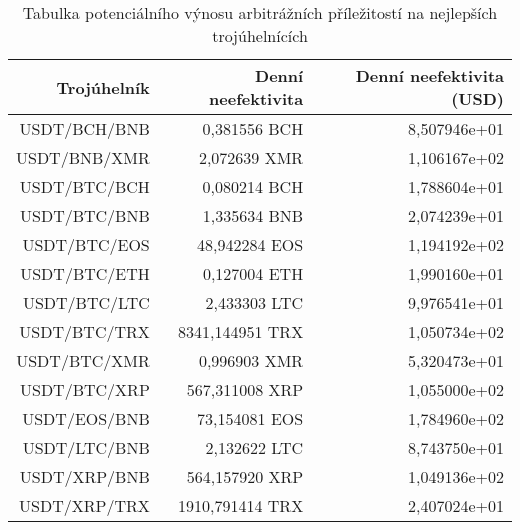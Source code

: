 \begin{table}\centering
\caption{Tabulka potenciálního výnosu arbitrážních příležitostí na nejlepších trojúhelnících}
\label{table_gains_best}
\begin{tabular}{|| r | r | r ||}\hline Trojúhelník & Denní neefektivita & Denní neefektivita (USD)\\ [0.5ex]
 \hline\hline USDT/BCH/BNB & 0,381556 BCH & 8,507946e+01\\ 
 \hline USDT/BNB/XMR & 2,072639 XMR & 1,106167e+02\\ 
 \hline USDT/BTC/BCH & 0,080214 BCH & 1,788604e+01\\ 
 \hline USDT/BTC/BNB & 1,335634 BNB & 2,074239e+01\\ 
 \hline USDT/BTC/EOS & 48,942284 EOS & 1,194192e+02\\ 
 \hline USDT/BTC/ETH & 0,127004 ETH & 1,990160e+01\\ 
 \hline USDT/BTC/LTC & 2,433303 LTC & 9,976541e+01\\ 
 \hline USDT/BTC/TRX & 8341,144951 TRX & 1,050734e+02\\ 
 \hline USDT/BTC/XMR & 0,996903 XMR & 5,320473e+01\\ 
 \hline USDT/BTC/XRP & 567,311008 XRP & 1,055000e+02\\ 
 \hline USDT/EOS/BNB & 73,154081 EOS & 1,784960e+02\\ 
 \hline USDT/LTC/BNB & 2,132622 LTC & 8,743750e+01\\ 
 \hline USDT/XRP/BNB & 564,157920 XRP & 1,049136e+02\\ 
 \hline USDT/XRP/TRX & 1910,791414 TRX & 2,407024e+01\\ 
 \hline
\end{tabular}
\end{table}
